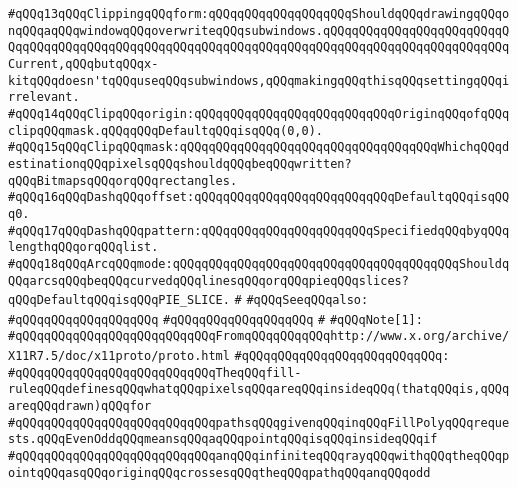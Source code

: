 \verb|#qQQq13qQQqClippingqQQqform:qQQqqQQqqQQqqQQqqQQqShouldqQQqdrawingqQQqonqQQqaqQQqwindowqQQqoverwriteqQQqsubwindows.qQQqqQQqqQQqqQQqqQQqqQQqqQQqqQQqqQQqqQQqqQQqqQQqqQQqqQQqqQQqqQQqqQQqqQQqqQQqqQQqqQQqqQQqqQQqqQQqCurrent,qQQqbutqQQqx-kitqQQqdoesn'tqQQquseqQQqsubwindows,qQQqmakingqQQqthisqQQqsettingqQQqirrelevant.|\newline
\verb|#qQQq14qQQqClipqQQqorigin:qQQqqQQqqQQqqQQqqQQqqQQqqQQqOriginqQQqofqQQqclipqQQqmask.qQQqqQQqDefaultqQQqisqQQq(0,0).|\newline
\verb|#qQQq15qQQqClipqQQqmask:qQQqqQQqqQQqqQQqqQQqqQQqqQQqqQQqqQQqWhichqQQqdestinationqQQqpixelsqQQqshouldqQQqbeqQQqwritten?qQQqBitmapsqQQqorqQQqrectangles.|\newline
\verb|#qQQq16qQQqDashqQQqoffset:qQQqqQQqqQQqqQQqqQQqqQQqqQQqDefaultqQQqisqQQq0.|\newline
\verb|#qQQq17qQQqDashqQQqpattern:qQQqqQQqqQQqqQQqqQQqqQQqSpecifiedqQQqbyqQQqlengthqQQqorqQQqlist.|\newline
\verb|#qQQq18qQQqArcqQQqmode:qQQqqQQqqQQqqQQqqQQqqQQqqQQqqQQqqQQqqQQqShouldqQQqarcsqQQqbeqQQqcurvedqQQqlinesqQQqorqQQqpieqQQqslices?qQQqDefaultqQQqisqQQqPIE_SLICE.|\newline
\verb|#|\newline
\verb|#qQQqSeeqQQqalso:|\newline
\verb|#qQQqqQQqqQQqqQQqqQQq|\newline
\verb|#qQQqqQQqqQQqqQQqqQQq|\newline
\verb|#|\newline
\verb|#qQQqNote[1]:|\newline
\verb|#qQQqqQQqqQQqqQQqqQQqqQQqqQQqFromqQQqqQQqqQQqhttp://www.x.org/archive/X11R7.5/doc/x11proto/proto.html|\newline
\verb|#qQQqqQQqqQQqqQQqqQQqqQQqqQQq:|\newline
\verb|#qQQqqQQqqQQqqQQqqQQqqQQqqQQqTheqQQqfill-ruleqQQqdefinesqQQqwhatqQQqpixelsqQQqareqQQqinsideqQQq(thatqQQqis,qQQqareqQQqdrawn)qQQqfor|\newline
\verb|#qQQqqQQqqQQqqQQqqQQqqQQqqQQqpathsqQQqgivenqQQqinqQQqFillPolyqQQqrequests.qQQqEvenOddqQQqmeansqQQqaqQQqpointqQQqisqQQqinsideqQQqif|\newline
\verb|#qQQqqQQqqQQqqQQqqQQqqQQqqQQqanqQQqinfiniteqQQqrayqQQqwithqQQqtheqQQqpointqQQqasqQQqoriginqQQqcrossesqQQqtheqQQqpathqQQqanqQQqodd|\newline
